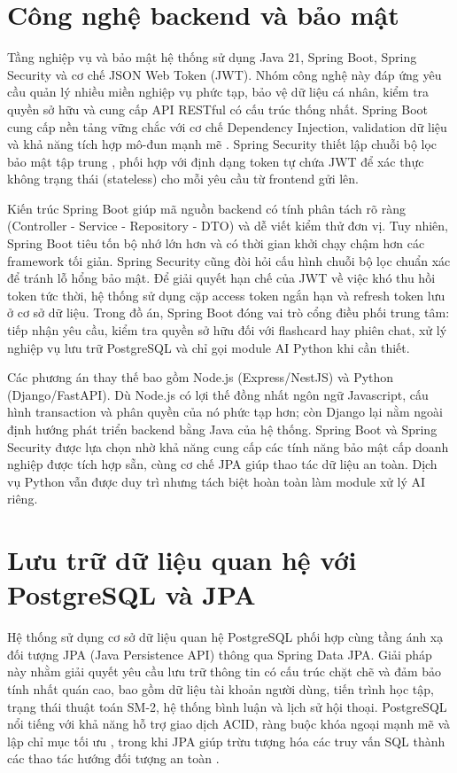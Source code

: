 \documentclass[../DoAn.tex]{subfiles}
\begin{document}
\section{Công nghệ backend và bảo mật}
\label{section:3.2}

Tầng nghiệp vụ và bảo mật hệ thống sử dụng Java 21, Spring Boot, Spring Security và cơ chế JSON Web Token (JWT). Nhóm công nghệ này đáp ứng yêu cầu quản lý nhiều miền nghiệp vụ phức tạp, bảo vệ dữ liệu cá nhân, kiểm tra quyền sở hữu và cung cấp API RESTful có cấu trúc thống nhất. Spring Boot cung cấp nền tảng vững chắc với cơ chế Dependency Injection, validation dữ liệu và khả năng tích hợp mô-đun mạnh mẽ \cite{spring-boot-docs}. Spring Security thiết lập chuỗi bộ lọc bảo mật tập trung \cite{spring-security-docs}, phối hợp với định dạng token tự chứa JWT \cite{jwt-rfc7519} để xác thực không trạng thái (stateless) cho mỗi yêu cầu từ frontend gửi lên.

Kiến trúc Spring Boot giúp mã nguồn backend có tính phân tách rõ ràng (Controller - Service - Repository - DTO) và dễ viết kiểm thử đơn vị. Tuy nhiên, Spring Boot tiêu tốn bộ nhớ lớn hơn và có thời gian khởi chạy chậm hơn các framework tối giản. Spring Security cũng đòi hỏi cấu hình chuỗi bộ lọc chuẩn xác để tránh lỗ hổng bảo mật. Để giải quyết hạn chế của JWT về việc khó thu hồi token tức thời, hệ thống sử dụng cặp access token ngắn hạn và refresh token lưu ở cơ sở dữ liệu. Trong đồ án, Spring Boot đóng vai trò cổng điều phối trung tâm: tiếp nhận yêu cầu, kiểm tra quyền sở hữu đối với flashcard hay phiên chat, xử lý nghiệp vụ lưu trữ PostgreSQL và chỉ gọi module AI Python khi cần thiết.

Các phương án thay thế bao gồm Node.js (Express/NestJS) và Python (Django/FastAPI). Dù Node.js có lợi thế đồng nhất ngôn ngữ Javascript, cấu hình transaction và phân quyền của nó phức tạp hơn; còn Django lại nằm ngoài định hướng phát triển backend bằng Java của hệ thống. Spring Boot và Spring Security được lựa chọn nhờ khả năng cung cấp các tính năng bảo mật cấp doanh nghiệp được tích hợp sẵn, cùng cơ chế JPA giúp thao tác dữ liệu an toàn. Dịch vụ Python vẫn được duy trì nhưng tách biệt hoàn toàn làm module xử lý AI riêng.

\section{Lưu trữ dữ liệu quan hệ với PostgreSQL và JPA}
\label{section:3.3}

Hệ thống sử dụng cơ sở dữ liệu quan hệ PostgreSQL phối hợp cùng tầng ánh xạ đối tượng JPA (Java Persistence API) thông qua Spring Data JPA. Giải pháp này nhằm giải quyết yêu cầu lưu trữ thông tin có cấu trúc chặt chẽ và đảm bảo tính nhất quán cao, bao gồm dữ liệu tài khoản người dùng, tiến trình học tập, trạng thái thuật toán SM-2, hệ thống bình luận và lịch sử hội thoại. PostgreSQL nổi tiếng với khả năng hỗ trợ giao dịch ACID, ràng buộc khóa ngoại mạnh mẽ và lập chỉ mục tối ưu \cite{postgresql-docs}, trong khi JPA giúp trừu tượng hóa các truy vấn SQL thành các thao tác hướng đối tượng an toàn \cite{spring-boot-docs}.
\end{document}
